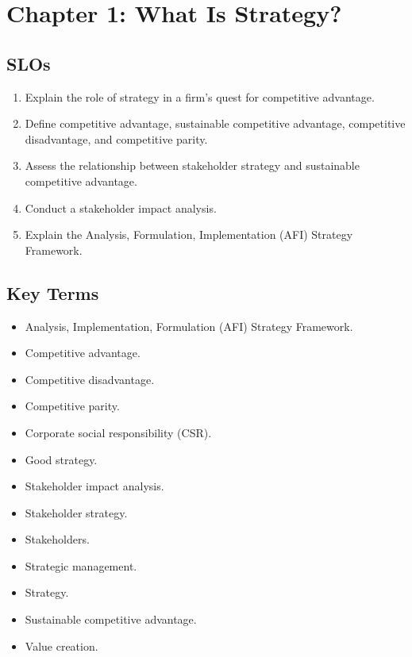 \documentclass[
]{book}
\providecommand{\tightlist}{%
  \setlength{\itemsep}{0pt}\setlength{\parskip}{0pt}}
\begin{document}
\hypertarget{chapter-1-what-is-strategy}{%
\chapter{Chapter 1: What Is Strategy?}\label{chapter-1-what-is-strategy}}

\hypertarget{slos}{%
\section{SLOs}\label{slos}}

\begin{enumerate}
\def\labelenumi{\arabic{enumi}.}
\tightlist
\item
  Explain the role of strategy in a firm's quest for competitive advantage.
\item
  Define competitive advantage, sustainable competitive advantage, competitive disadvantage, and competitive parity.
\item
  Assess the relationship between stakeholder strategy and sustainable competitive advantage.
\item
  Conduct a stakeholder impact analysis.
\item
  Explain the Analysis, Formulation, Implementation (AFI) Strategy Framework.
\end{enumerate}

\hypertarget{key-terms}{%
\section{Key Terms}\label{key-terms}}

\begin{itemize}
\tightlist
\item
  Analysis, Implementation, Formulation (AFI) Strategy Framework.
\item
  Competitive advantage.
\item
  Competitive disadvantage.
\item
  Competitive parity.
\item
  Corporate social responsibility (CSR).
\item
  Good strategy.
\item
  Stakeholder impact analysis.
\item
  Stakeholder strategy.
\item
  Stakeholders.
\item
  Strategic management.
\item
  Strategy.
\item
  Sustainable competitive advantage.
\item
  Value creation.
\end{itemize}
\end{document}
